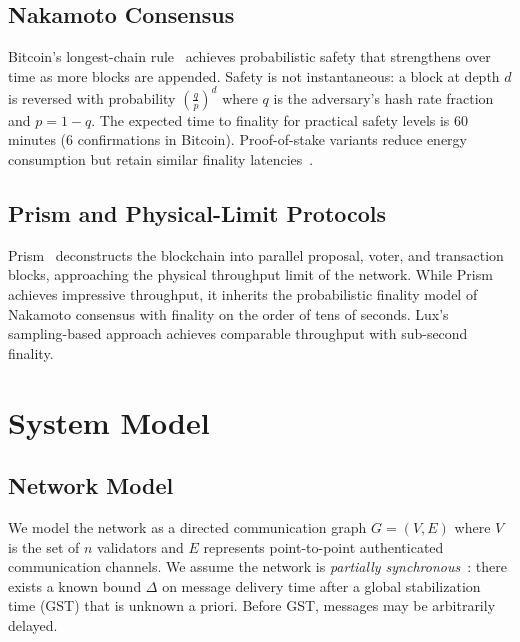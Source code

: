 \documentclass[11pt,a4paper]{article}
\begin{document}
\subsection{Nakamoto Consensus}

Bitcoin's longest-chain rule~\cite{nakamoto2008bitcoin} achieves probabilistic safety that
strengthens over time as more blocks are appended. Safety is not instantaneous: a block
at depth $d$ is reversed with probability $\left(\frac{q}{p}\right)^d$ where $q$ is the
adversary's hash rate fraction and $p = 1-q$. The expected time to finality for practical
safety levels is 60 minutes (6 confirmations in Bitcoin). Proof-of-stake variants reduce
energy consumption but retain similar finality latencies~\cite{buterin2020ethereum2}.

\subsection{Prism and Physical-Limit Protocols}

Prism~\cite{bagaria2019prism} deconstructs the blockchain into parallel proposal, voter, and
transaction blocks, approaching the physical throughput limit of the network. While Prism
achieves impressive throughput, it inherits the probabilistic finality model of Nakamoto
consensus with finality on the order of tens of seconds. Lux's sampling-based approach
achieves comparable throughput with sub-second finality.

\section{System Model}
\label{sec:model}

\subsection{Network Model}

We model the network as a directed communication graph $G = (V, E)$ where $V$ is the set
of $n$ validators and $E$ represents point-to-point authenticated communication channels.
We assume the network is \emph{partially synchronous}~\cite{dwork1988consensus}: there
exists a known bound $\Delta$ on message delivery time after a global stabilization time
(GST) that is unknown a priori. Before GST, messages may be arbitrarily delayed.
\end{document}
